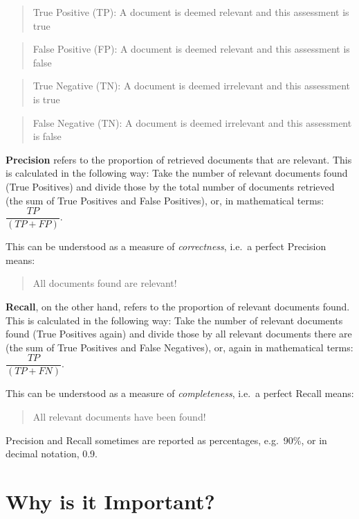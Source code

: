 \documentclass[
  letterpaper,
]{scrreprt}
\begin{document}
\begin{quote}
True Positive (TP): A document is deemed relevant and this assessment is
true
\end{quote}

\begin{quote}
False Positive (FP): A document is deemed relevant and this assessment
is false
\end{quote}

\begin{quote}
True Negative (TN): A document is deemed irrelevant and this assessment
is true
\end{quote}

\begin{quote}
False Negative (TN): A document is deemed irrelevant and this assessment
is false
\end{quote}

\textbf{Precision} refers to the proportion of retrieved documents that
are relevant. This is calculated in the following way: Take the number
of relevant documents found (True Positives) and divide those by the
total number of documents retrieved (the sum of True Positives and False
Positives), or, in mathematical terms: \(\dfrac{TP}{(TP+FP)}\).

This can be understood as a measure of \emph{correctness}, i.e.~a
perfect Precision means:

\begin{quote}
All documents found are relevant!
\end{quote}

\textbf{Recall}, on the other hand, refers to the proportion of relevant
documents found. This is calculated in the following way: Take the
number of relevant documents found (True Positives again) and divide
those by all relevant documents there are (the sum of True Positives and
False Negatives), or, again in mathematical terms:
\(\dfrac{TP}{(TP+FN)}\).

This can be understood as a measure of \emph{completeness}, i.e.~a
perfect Recall means:

\begin{quote}
All relevant documents have been found!
\end{quote}

Precision and Recall sometimes are reported as percentages, e.g.~90\%,
or in decimal notation, 0.9.

\section{Why is it Important?}\label{why-is-it-important-3}
\end{document}
